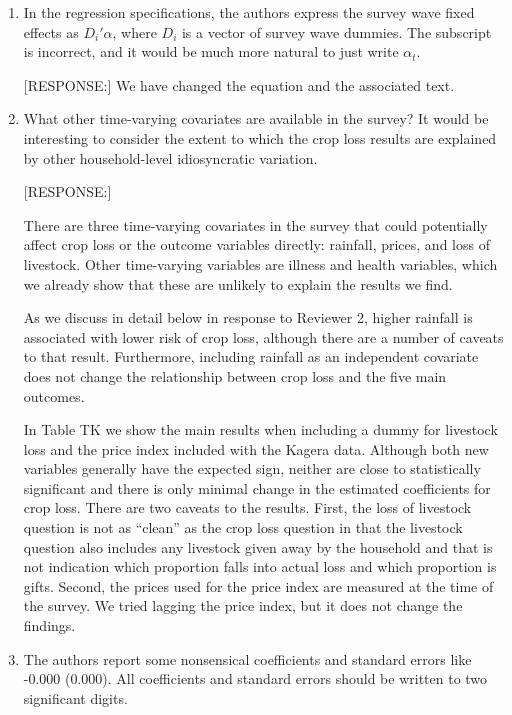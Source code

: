 \documentclass[letterpaper,12pt]{article}
\begin{document}
\begin{enumerate}
\item In the regression specifications, the authors express the survey
wave fixed effects as $D_{i}'\alpha$, where $D_{i}$ is a vector of survey
wave dummies. The subscript is incorrect, and it would be much more
natural to just write $\alpha_{t}$.

[RESPONSE:] We have changed the equation and the associated text.

\item What other time-varying covariates are available in the survey? It
would be interesting to consider the extent to which the crop loss
results are explained by other household-level idiosyncratic variation.

[RESPONSE:] 

There are three time-varying covariates in the survey that could 
potentially affect crop loss or the outcome variables directly:
rainfall, prices, and loss of livestock.
Other time-varying variables are illness and health variables, which 
we already show that these are unlikely to explain the results we find.

As we discuss in detail below in response to Reviewer 2, higher 
rainfall is associated with lower risk of crop loss, although there
are a number of caveats to that result.
Furthermore, including rainfall as an independent covariate does 
not change the relationship between crop loss and the five main outcomes.

In Table TK we show the main results when including a dummy for livestock
loss and the price index included with the Kagera data.
Although both new variables generally have the expected sign, neither are 
close to statistically significant and there is only minimal change in the 
estimated coefficients for crop loss.
There are two caveats to the results.
First, the loss of livestock question is not as ``clean'' as the
crop loss question in that the livestock question also includes 
any livestock given away by the household and that is not indication which
proportion falls into actual loss and which proportion is gifts.
Second, the prices used for the price index are measured at the time
of the survey.
We tried lagging the price index, but it does not change the findings.



\item The authors report some nonsensical coefficients and standard
errors like -0.000 (0.000). All coefficients and standard errors should
be written to two significant digits.


\end{enumerate}
\end{document}
